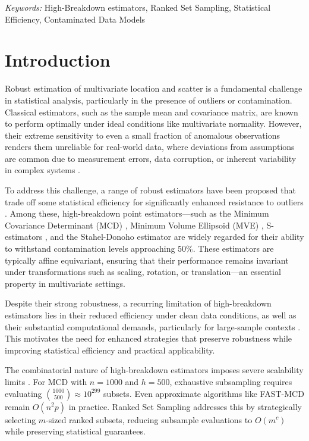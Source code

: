 \documentclass[12pt]{article}
\begin{document}
\noindent%
{\it Keywords:} High-Breakdown estimators, Ranked Set Sampling, Statistical Efficiency, Contaminated Data Models
\vfill

\newpage
{} %

\section{Introduction}
Robust estimation of multivariate location and scatter is a fundamental challenge in statistical analysis, particularly in the presence of outliers or contamination. Classical estimators, such as the sample mean and covariance matrix, are known to perform optimally under ideal conditions like multivariate normality. However, their extreme sensitivity to even a small fraction of anomalous observations renders them unreliable for real-world data, where deviations from assumptions are common due to measurement errors, data corruption, or inherent variability in complex systems \cite{maronna2019robust}.

To address this challenge, a range of robust estimators have been proposed that trade off some statistical efficiency for significantly enhanced resistance to outliers \cite{maronna2019robust}.
Among these, high-breakdown point estimators—such as the Minimum Covariance Determinant (MCD) \cite{rousseeuw1999fast,hubert2018minimum,
Mayrhofer2025},
Minimum Volume Ellipsoid (MVE) \cite{rousseeuw1999fast},
S-estimators \cite{maronna2019robust}, and the Stahel-Donoho estimator \cite{maronna2019robust}
are widely regarded for their ability to withstand contamination levels approaching $50\%$. These estimators are typically affine equivariant, ensuring that their performance remains invariant under transformations such as scaling, rotation, or translation—an essential property in multivariate settings.

Despite their strong robustness, a recurring limitation of high-breakdown estimators lies in their reduced efficiency under clean data conditions, as well as their substantial computational demands, particularly for large-sample contexts \cite{Hubert2012,Raymaekers2023}. This motivates the need for enhanced strategies that preserve robustness while improving statistical efficiency and practical applicability.

The combinatorial nature of high-breakdown estimators imposes severe scalability limits \cite{maronna2019robust}.
For MCD with $n=1000$ and $h=500$, exhaustive subsampling requires evaluating $\binom{1000}{500} \approx 10^{299}$ subsets. Even approximate algorithms like FAST-MCD \cite{hubert2018minimum} remain $O(n^2 p)$ in practice. Ranked Set Sampling addresses this by strategically selecting $m$-sized ranked subsets, reducing subsample evaluations to $O(m^c)$ while preserving statistical guarantees.
\end{document}
